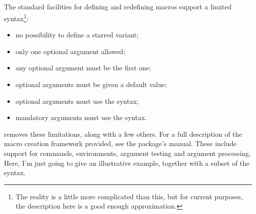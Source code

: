 \subsection[xparse]{\protect{}}\label{subsec:xparse}


The standard \LaTeXe{} facilities for defining and redefining macros support a limited syntax\footnote{%
  The reality is a little more complicated than this, but for current purposes, the description here is a good enough approximation.%
}:
\begin{itemize}
  \item no possibility to define a starred variant;
  \item only one optional argument allowed;
  \item any optional argument must be the first one;
  \item optional arguments must be given a default value;
  \item optional arguments must use the  syntax;
  \item mandatory arguments must use the  syntax.
\end{itemize}
 removes these limitations, along with a few others.
For a full description of the macro creation framework provided, see the package's manual.
These include support for commands, environments, argument testing and argument processing.
Here, I'm just going to give an illustrative example, together with a subset of the syntax.

